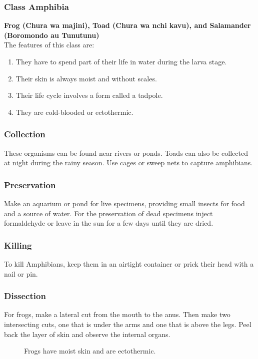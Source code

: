 \subsubsection{Class Amphibia}
\textbf{Frog (Chura wa majini), Toad (Chura wa nchi kavu), and Salamander (Boromondo au Tunutunu)}\\The features of this class are:
\begin{enumerate}
\item{They have to spend part of their life in water during the larva stage.}
\item{Their skin is always moist and without scales.}
\item{Their life cycle involves a form called a tadpole.}
\item{They are cold-blooded or ectothermic.}
\end{enumerate}

\subsubsection{Collection}
These organisms can be found near rivers or ponds. Toads can also be collected at night during the rainy season. Use cages or sweep nets to capture amphibians.

\subsubsection{Preservation} 
Make an aquarium or pond for live specimens, providing small insects for food and a source of water. For the preservation of dead specimens inject formaldehyde or leave in the sun for a few days until they are dried.

\subsubsection{Killing}
To kill Amphibians, keep them in an airtight container or prick their head with a nail or pin.

\subsubsection{Dissection}
For frogs, make a lateral cut from the mouth to the anus. Then make two intersecting cuts, one that is under the arms and one that is above the legs. Peel back the layer of skin and observe the internal organs.

\begin{figure}[h]
\begin{center}
\def\svgwidth{6cm}

\caption{Frogs have moist skin and are ectothermic.}
\label{fig:anae-resp3}
\end{center}
\end{figure}

